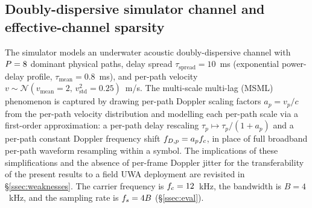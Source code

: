 \subsection{Doubly-dispersive simulator channel and effective-channel sparsity}
\label{ssec:channel}

The simulator models an underwater acoustic doubly-dispersive channel with $P = 8$ dominant physical paths, delay spread $\tau_{\text{spread}} = 10$~ms (exponential power-delay profile, $\tau_{\text{mean}} = 0.8$~ms), and per-path velocity $v \sim \mathcal{N}(v_{\text{mean}} = 2,\, v_{\text{std}}^2 = 0.25)$~m/s. The multi-scale multi-lag (MSML) phenomenon is captured by drawing per-path Doppler scaling factors $a_p = v_p / c$ from the per-path velocity distribution and modelling each per-path scale via a first-order approximation: a per-path delay rescaling $\tau_p \mapsto \tau_p / (1 + a_p)$ and a per-path constant Doppler frequency shift $f_{D,p} = a_p f_c$, in place of full broadband per-path waveform resampling within a symbol. The implications of these simplifications and the absence of per-frame Doppler jitter for the transferability of the present results to a field UWA deployment are revisited in \S\ref{ssec:weaknesses}. The carrier frequency is $f_c = 12$~kHz, the bandwidth is $B = 4$~kHz, and the sampling rate is $f_s = 4B$ (\S\ref{ssec:eval}).

